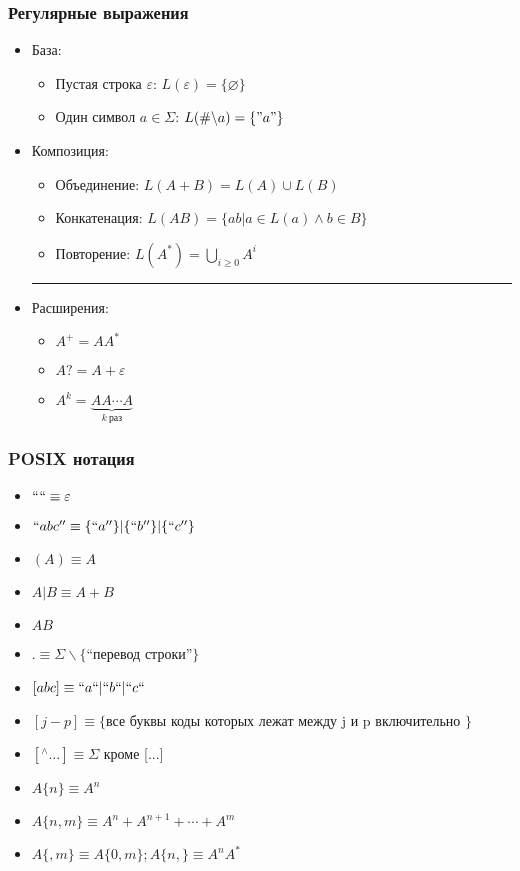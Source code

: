 \documentclass[16pt,pdf,unicode]{beamer}
\begin{document}
\begin{frame}
  \frametitle{Регулярные выражения}
  \begin{itemize}
  \item База:
    \begin{itemize}
      \item Пустая строка $\varepsilon$: $L(\varepsilon) = \{\varnothing\}$
      \item Один символ $a\in \Sigma$: $L(\#\backslash a) = \{"a"\}$
    \end{itemize}
  \item Композиция:
    \begin{itemize}
      \item Объединение: $L(A + B) = L(A) \cup L(B)$
      \item Конкатенация: $L(AB) = \{ab|a\in L(a) \wedge b\in B \}$
      \item Повторение: $L(A^*) = \bigcup\limits_{i\geq0}A^i$
    \end{itemize}
    \hrule
  \item Расширения:
    \begin{itemize}
      \item $A^+=AA^*$
      \item $A?=A+\varepsilon$
      \item $A^k=\underbrace{AA\dotsm A}_{k\ \text{раз}}$
    \end{itemize}
  \end{itemize}
\end{frame}

\begin{frame}
  \frametitle{POSIX нотация}
  \begin{itemize}
    \item $```` \equiv \varepsilon$
    \item $``abc'' \equiv \{``a''\}|\{``b''\}|\{``c''\}$
    \item $(A) \equiv A$
    \item $A|B \equiv A+B$
    \item $AB$
    \item $. \equiv \Sigma \backslash\{$``перевод строки''$\}$
    \item $[abc] \equiv ``a``|``b``|``c``$
    \item $[j-p] \equiv\{$все буквы коды которых лежат между j и p включительно $\}$
    \item $[^\wedge...] \equiv \Sigma$ кроме [...]
    \item $A\{n\} \equiv A^n$
    \item $A\{n,m\} \equiv A^n + A^{n+1} + \dotsb + A^m$
    \item $A\{,m\} \equiv A\{0,m\} ; A\{n,\} \equiv A^nA^*$
  \end{itemize}
\end{frame}
\end{document}
